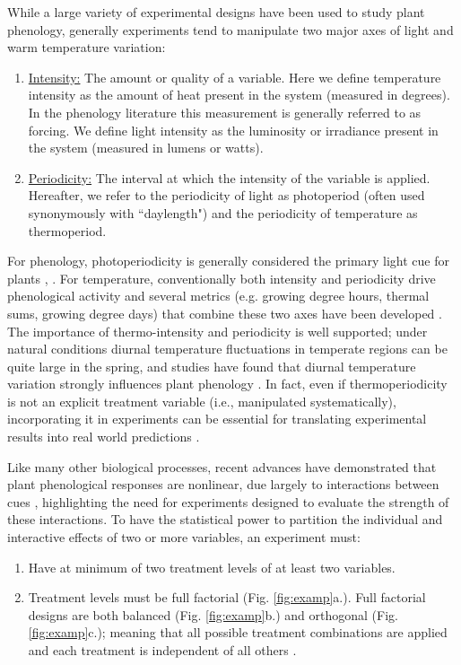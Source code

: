 \documentclass[11pt]{article}
\begin{document}
While a large variety of experimental designs have been used to study plant phenology, generally experiments tend to manipulate two major axes of light and warm temperature variation:
\begin{enumerate}
\item \underline{Intensity:} The amount or quality of a variable. Here we define temperature intensity as the amount of heat present in the system (measured in degrees). In the phenology literature this measurement is generally referred to as forcing. We define light intensity as the luminosity or irradiance present in the system (measured in lumens or watts). 
\item \underline{Periodicity:} The interval at which the intensity of the variable is applied. Hereafter, we refer to the periodicity of light as photoperiod (often used synonymously with ``daylength") and the periodicity of temperature as thermoperiod. 
\end{enumerate}
For phenology, photoperiodicity is generally considered the primary light cue for plants \citep{WAY:2015aa}, \citep[though regarding light intensity and phenology see][]{Brelsford2018,Cober1996}. For temperature, conventionally both intensity and periodicity drive phenological activity and several metrics (e.g. growing degree hours, thermal sums, growing degree days)  that combine these two axes have been developed \citep{Gu:2016wa}. The importance of thermo-intensity and periodicity is well supported; under natural conditions diurnal temperature fluctuations in temperate regions can be quite large in the spring, and studies have found that diurnal temperature variation strongly influences plant phenology \citep{Burghardt:2016uy}. In fact, even if thermoperiodicity is not an explicit treatment variable (i.e., manipulated systematically), incorporating it in experiments can be essential for translating experimental results into real world predictions \citep{plants9101312}.

Like many other biological processes, recent advances have demonstrated that plant phenological responses are nonlinear, due largely to interactions between cues \citep{Wolkovich:2022ue,fu2015}, highlighting the need for experiments designed to evaluate the strength of these interactions. To have the statistical power to partition the individual and interactive effects of two or more variables, an experiment must:
\begin{enumerate}
\item Have at minimum of two treatment levels of at least two variables.
\item Treatment levels must be full factorial (Fig. \ref{fig:examp}a.). Full factorial designs are both balanced (Fig. \ref{fig:examp}b.)  and orthogonal (Fig. \ref{fig:examp}c.); meaning that all possible treatment combinations are applied and each treatment is independent of all others \citep{cheng2016}.
\end{enumerate}
\end{document}
